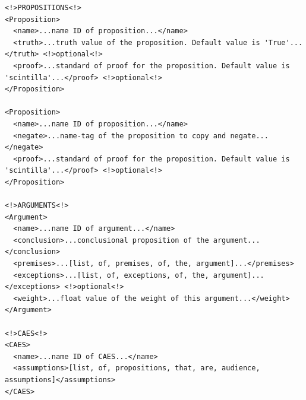 \documentclass[10pt,a4paper,twocolumn]{article}
\begin{document}
\begin{lstlisting}
<!>PROPOSITIONS<!>
<Proposition>
  <name>...name ID of proposition...</name>
  <truth>...truth value of the proposition. Default value is 'True'...</truth> <!>optional<!>
  <proof>...standard of proof for the proposition. Default value is 'scintilla'...</proof> <!>optional<!>
</Proposition>

<Proposition>
  <name>...name ID of proposition...</name>
  <negate>...name-tag of the proposition to copy and negate...</negate>
  <proof>...standard of proof for the proposition. Default value is 'scintilla'...</proof> <!>optional<!>
</Proposition>

<!>ARGUMENTS<!>
<Argument>
  <name>...name ID of argument...</name>
  <conclusion>...conclusional proposition of the argument...</conclusion>
  <premises>...[list, of, premises, of, the, argument]...</premises>
  <exceptions>...[list, of, exceptions, of, the, argument]...</exceptions> <!>optional<!>
  <weight>...float value of the weight of this argument...</weight>
</Argument>

<!>CAES<!>
<CAES>
  <name>...name ID of CAES...</name>
  <assumptions>[list, of, propositions, that, are, audience, assumptions]</assumptions>
</CAES>
\end{lstlisting}
\end{document}

